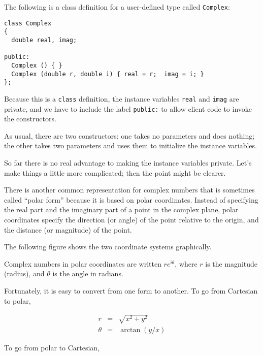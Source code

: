 The following is a class definition for a user-defined type called
{\tt Complex}:

\begin{verbatim}
class Complex
{
  double real, imag;

public:
  Complex () { }
  Complex (double r, double i) { real = r;  imag = i; }
};
\end{verbatim}
%
Because this is a {\tt class} definition, the instance variables
{\tt real} and {\tt imag} are private, and we have to include
the label {\tt public:} to allow client code to invoke the
constructors.

As usual, there are two constructors: one takes no parameters and does
nothing; the other takes two parameters and uses them to initialize
the instance variables.


So far there is no real advantage to making the instance
variables private.  Let's make things a little more complicated;
then the point might be clearer.


There is another common representation for complex numbers that is
sometimes called ``polar form'' because it is based on polar
coordinates.  Instead of specifying the real part and the imaginary
part of a point in the complex plane, polar coordinates specify the
direction (or angle) of the point relative to the origin, and
the distance (or magnitude) of the point.  

The following figure shows the two coordinate systems graphically.

\vspace {0.1in}
\centerline{}
\vspace {0.1in}

Complex numbers in polar coordinates are written $r e^{i \theta}$,
where $r$ is the magnitude (radius), and $\theta$ is the angle in
radians.

Fortunately, it is easy to convert from one form to another.
To go from Cartesian to polar,

\begin{eqnarray*}
r       & = &  \sqrt{x^2 + y^2} \\
\theta  & = &  \arctan (y / x)
\end{eqnarray*}

To go from polar to Cartesian,

